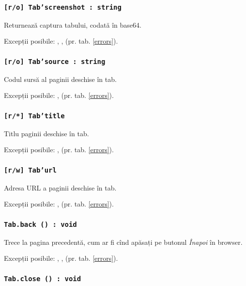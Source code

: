 \subsubsection{\texttt{[r/o] Tab'screenshot : string}}

Returnează captura tabului, codată în base64.

Excepții posibile: , ,  (pr. tab. \ref{errors}).

\subsubsection{\texttt{[r/o] Tab'source : string}}

Codul sursă al paginii deschise în tab.

Excepții posibile: ,  (pr. tab. \ref{errors}).

\subsubsection{\texttt{[r/*] Tab'title}}

Titlu paginii deschise în tab.

Excepții posibile: ,  (pr. tab. \ref{errors}).

\subsubsection{\texttt{[r/w] Tab'url}}

Adresa URL a paginii deschise în tab.

Excepții posibile: ,  (pr. tab. \ref{errors}).

\subsubsection{\texttt{Tab.back () : void}}

Trece la pagina precedentă, cum ar fi cînd apăsați pe butonul \textit{Înapoi} în browser.

Excepții posibile: , ,  (pr. tab. \ref{errors}).

\subsubsection{\texttt{Tab.close () : void}}

